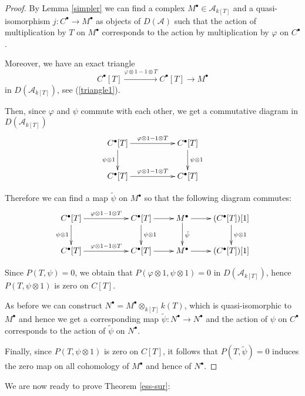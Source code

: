 \documentclass{amsart}
\begin{document}
\begin{proof}
By Lemma \ref{simpler} we can find a complex $M^{\bullet}\in \mathcal{A}_{k[T]}$ and a quasi-isomorphism
$j : C^\bullet \to M^\bullet$ as objects of $D(\mathcal{A})$ such that the action of multiplication by $T$ on $M^\bullet$ corresponds to the action by multiplication by $\varphi$
on $C^\bullet$.

Moreover, we have an exact triangle
$$C^{\bullet}[T] \xrightarrow{\varphi\otimes 1-1\otimes T}C^{\bullet}[T]\longrightarrow M^{\bullet}$$
in $D(\mathcal{A}_{k[T]})$, see (\ref{triangle1}).

Then, since $\varphi$ and $\psi$ commute with each other, we get a commutative diagram in $D(\mathcal{A}_{k[T]})$
$$
\xymatrix{
C^\bullet[T] \ar[rr]^{\varphi \otimes 1 - 1 \otimes T}
\ar[d]_{\psi \otimes 1} & &
C^\bullet[T] \ar[d]^{\psi \otimes 1} \\
C^\bullet[T] \ar[rr]^{\varphi \otimes 1 - 1 \otimes T} & &
C^\bullet[T]
}
$$

Therefore we can find a map $\tilde{\psi}$ on $M^{\bullet}$ so that the following diagram commutes:
$$
\xymatrix{
C^\bullet[T] \ar[rr]^{\varphi \otimes 1 - 1 \otimes T}
\ar[d]_{\psi\otimes 1} & & C^\bullet[T] \ar[d]^{\psi\otimes 1}  \ar[r] &
M^\bullet \ar[d]^{\tilde{\psi}} \ar[r] & (C^\bullet[T])[1] \ar[d]^{\psi\otimes 1} \\
C^\bullet[T] \ar[rr]^{\varphi \otimes 1 - 1 \otimes T} & &
C^\bullet[T] \ar[r] &
M^\bullet \ar[r] & (C^\bullet[T])[1]
}
$$

Since $P(T,\psi)=0$, we obtain that $P(\varphi\otimes 1, \psi\otimes 1)=0$ in $D(\mathscr{A}_{k[T]})$, hence $P(T,\psi\otimes 1)$ is zero on $C[T]$. 

As before we can construct $N^{\bullet}=M^\bullet \otimes_{k[T]} k(T)$, which is quasi-isomorphic to $M^{\bullet}$ and hence we get a corresponding map $\tilde{\psi}: N^{\bullet}\to N^{\bullet}$ and the action of $\psi$ on $C^{\bullet}$ corresponds to the action of $\tilde{\psi}$ on $N^{\bullet}$. 

Finally, since $P(T,\psi\otimes 1)$ is zero on $C[T]$, it follows that $P(T,\tilde{\psi})=0$ induces the zero map on all cohomology of $M^{\bullet}$ and hence of $N^{\bullet}$.
\end{proof}

We are now ready to prove Theorem \ref{ess-sur}:
\end{document}
